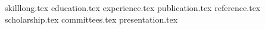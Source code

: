 \documentclass[11pt, a4paper]{awesome-cv}
\newcommand*{\sectiondir}{resume/}
\begin{document}
\makecvheader    
              
{skilllong.tex}
{education.tex}
{experience.tex}
{publication.tex}
{reference.tex}
\newpage
{scholarship.tex}
{committees.tex}
{presentation.tex}  
\end{document}

